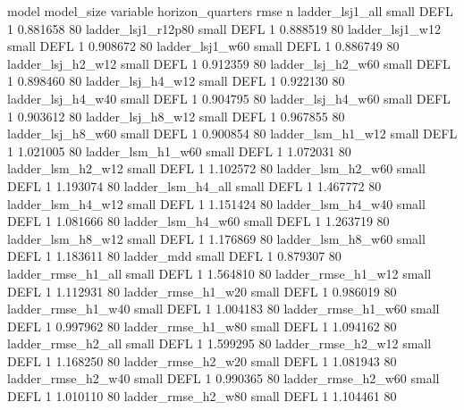                    model model_size variable  horizon_quarters     rmse  n
         ladder_lsj1_all      small     DEFL                 1 0.881658 80
      ladder_lsj1_r12p80      small     DEFL                 1 0.888519 80
         ladder_lsj1_w12      small     DEFL                 1 0.908672 80
         ladder_lsj1_w60      small     DEFL                 1 0.886749 80
       ladder_lsj_h2_w12      small     DEFL                 1 0.912359 80
       ladder_lsj_h2_w60      small     DEFL                 1 0.898460 80
       ladder_lsj_h4_w12      small     DEFL                 1 0.922130 80
       ladder_lsj_h4_w40      small     DEFL                 1 0.904795 80
       ladder_lsj_h4_w60      small     DEFL                 1 0.903612 80
       ladder_lsj_h8_w12      small     DEFL                 1 0.967855 80
       ladder_lsj_h8_w60      small     DEFL                 1 0.900854 80
       ladder_lsm_h1_w12      small     DEFL                 1 1.021005 80
       ladder_lsm_h1_w60      small     DEFL                 1 1.072031 80
       ladder_lsm_h2_w12      small     DEFL                 1 1.102572 80
       ladder_lsm_h2_w60      small     DEFL                 1 1.193074 80
       ladder_lsm_h4_all      small     DEFL                 1 1.467772 80
       ladder_lsm_h4_w12      small     DEFL                 1 1.151424 80
       ladder_lsm_h4_w40      small     DEFL                 1 1.081666 80
       ladder_lsm_h4_w60      small     DEFL                 1 1.263719 80
       ladder_lsm_h8_w12      small     DEFL                 1 1.176869 80
       ladder_lsm_h8_w60      small     DEFL                 1 1.183611 80
              ladder_mdd      small     DEFL                 1 0.879307 80
      ladder_rmse_h1_all      small     DEFL                 1 1.564810 80
      ladder_rmse_h1_w12      small     DEFL                 1 1.112931 80
      ladder_rmse_h1_w20      small     DEFL                 1 0.986019 80
      ladder_rmse_h1_w40      small     DEFL                 1 1.004183 80
      ladder_rmse_h1_w60      small     DEFL                 1 0.997962 80
      ladder_rmse_h1_w80      small     DEFL                 1 1.094162 80
      ladder_rmse_h2_all      small     DEFL                 1 1.599295 80
      ladder_rmse_h2_w12      small     DEFL                 1 1.168250 80
      ladder_rmse_h2_w20      small     DEFL                 1 1.081943 80
      ladder_rmse_h2_w40      small     DEFL                 1 0.990365 80
      ladder_rmse_h2_w60      small     DEFL                 1 1.010110 80
      ladder_rmse_h2_w80      small     DEFL                 1 1.104461 80
